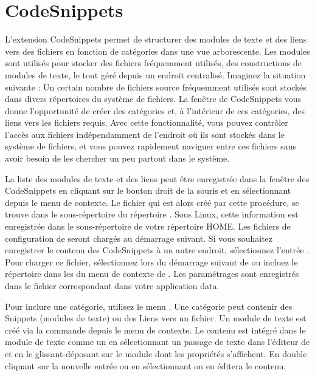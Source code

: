 \section{CodeSnippets}\label{sec:codesnippets}

L'extension CodeSnippets permet de structurer des modules de texte et des liens vers des fichiers en fonction de catégories dans une vue arborescente. Les modules sont utilisés pour stocker des fichiers fréquemment utilisés, des constructions de modules de texte, le tout géré depuis un endroit centralisé. Imaginez la situation suivante : Un certain nombre de fichiers source fréquemment utilisés sont stockés dans divers répertoires du système de fichiers. La fenêtre de CodeSnippets vous donne l'opportunité de créer des catégories et, à l'intérieur de ces catégories, des liens vers les fichiers requis. Avec cette fonctionnalité, vous pouvez contrôler l'accès aux fichiers indépendamment de l'endroit où ils sont stockés dans le système de fichiers, et vous pouvez rapidement naviguer entre ces fichiers sans avoir besoin de les chercher un peu partout dans le système.


La liste des modules de texte et des liens peut être enregistrée dans la fenêtre des CodeSnippets en cliquant sur le bouton droit de la souris et en sélectionnant  depuis le menu de contexte. Le fichier  qui est alors créé par cette procédure, se trouve dans le sous-répertoire  du répertoire . Sous Linux, cette information est enregistrée dans le sous-répertoire  de votre répertoire HOME. Les fichiers de configuration de \codeblocks seront chargés au démarrage suivant. Si vous souhaitez enregistrer le contenu des CodeSnippets à un autre endroit, sélectionnez l'entrée . Pour charger ce fichier, sélectionnez  lors du démarrage suivant de \codeblocks ou incluez le répertoire dans les  du menu de contexte de . Les paramétrages sont enregistrés dans le fichier correspondant  dans votre application data.

Pour inclure une catégorie, utilisez le menu . Une catégorie peut contenir des  Snippets (modules de texte) ou des Liens vers un fichier. Un module de texte est créé via la commande  depuis le menu de contexte. Le contenu est intégré dans le module de texte comme un  en sélectionnant un passage de texte dans l'éditeur de \codeblocks et en le glissant-déposant sur le module dont les propriétés s'affichent. En double cliquant sur la nouvelle entrée ou en sélectionnant   on en éditera le contenu.

